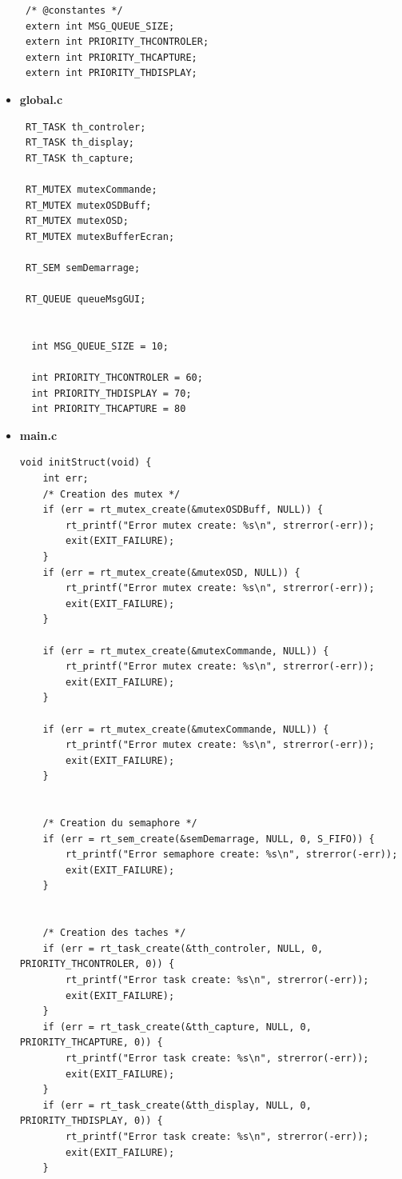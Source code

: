 \documentclass[11pt, a4paper]{paper}
\begin{document}
\begin{itemize}
\begin{lstlisting}
 /* @constantes */
 extern int MSG_QUEUE_SIZE;
 extern int PRIORITY_THCONTROLER;
 extern int PRIORITY_THCAPTURE;
 extern int PRIORITY_THDISPLAY;
\end{lstlisting}


\item \large{\bf global.c}

\lstset{language=C} 
\begin{lstlisting}
 RT_TASK th_controler;
 RT_TASK th_display;
 RT_TASK th_capture;

 RT_MUTEX mutexCommande;
 RT_MUTEX mutexOSDBuff;
 RT_MUTEX mutexOSD;
 RT_MUTEX mutexBufferEcran;

 RT_SEM semDemarrage;
 
 RT_QUEUE queueMsgGUI;


  int MSG_QUEUE_SIZE = 10;

  int PRIORITY_THCONTROLER = 60;
  int PRIORITY_THDISPLAY = 70;
  int PRIORITY_THCAPTURE = 80
\end{lstlisting}

\item \large{\bf main.c}

\lstset{language=C} 
\begin{lstlisting}
void initStruct(void) {
    int err;
    /* Creation des mutex */
    if (err = rt_mutex_create(&mutexOSDBuff, NULL)) {
        rt_printf("Error mutex create: %s\n", strerror(-err));
        exit(EXIT_FAILURE);
    }
    if (err = rt_mutex_create(&mutexOSD, NULL)) {
        rt_printf("Error mutex create: %s\n", strerror(-err));
        exit(EXIT_FAILURE);
    }

    if (err = rt_mutex_create(&mutexCommande, NULL)) {
        rt_printf("Error mutex create: %s\n", strerror(-err));
        exit(EXIT_FAILURE);
    }

    if (err = rt_mutex_create(&mutexCommande, NULL)) {
        rt_printf("Error mutex create: %s\n", strerror(-err));
        exit(EXIT_FAILURE);
    }


    /* Creation du semaphore */
    if (err = rt_sem_create(&semDemarrage, NULL, 0, S_FIFO)) {
        rt_printf("Error semaphore create: %s\n", strerror(-err));
        exit(EXIT_FAILURE);
    }

    
    /* Creation des taches */
    if (err = rt_task_create(&tth_controler, NULL, 0, PRIORITY_THCONTROLER, 0)) {
        rt_printf("Error task create: %s\n", strerror(-err));
        exit(EXIT_FAILURE);
    }
    if (err = rt_task_create(&tth_capture, NULL, 0, PRIORITY_THCAPTURE, 0)) {
        rt_printf("Error task create: %s\n", strerror(-err));
        exit(EXIT_FAILURE);
    }
    if (err = rt_task_create(&tth_display, NULL, 0, PRIORITY_THDISPLAY, 0)) {
        rt_printf("Error task create: %s\n", strerror(-err));
        exit(EXIT_FAILURE);
    }



\end{lstlisting}
\end{itemize}
\end{document}
